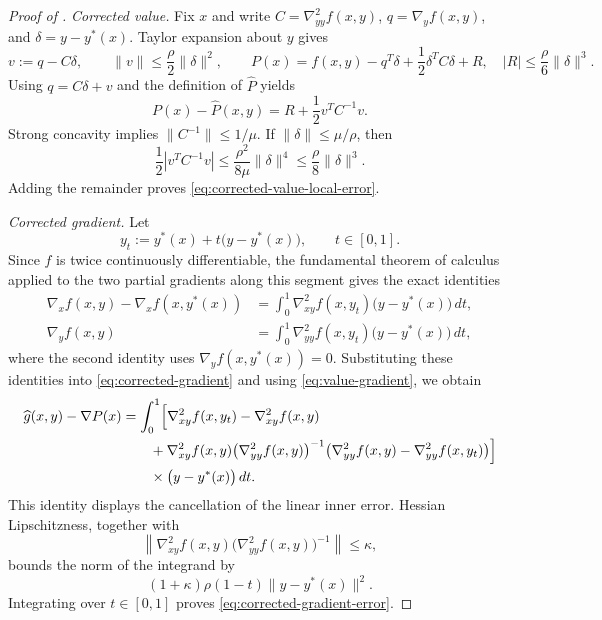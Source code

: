 \documentclass{article}
\begin{document}
\begin{proof}[Proof of ]
\smallskip\noindent\emph{Corrected value.}
Fix $x$ and write $C=\nabla^2_{yy}f(x,y)$,
$q=\nabla_yf(x,y)$, and $\delta=y-y^*(x)$.
Taylor expansion about $y$ gives
\[
 v:=q-C\delta,\qquad
 \|v\|\le\frac\rho2\|\delta\|^2,\qquad
 P(x)=f(x,y)-q^T\delta+\frac12\delta^TC\delta+R,
 \quad |R|\le\frac\rho6\|\delta\|^3.
\]
Using $q=C\delta+v$ and the definition of $\widehat P$ yields
\[
 P(x)-\widehat P(x,y)=R+\frac12v^TC^{-1}v.
\]
Strong concavity implies $\|C^{-1}\|\le1/\mu$.  If
$\|\delta\|\le\mu/\rho$, then
\[
 \frac12|v^TC^{-1}v|
 \le\frac{\rho^2}{8\mu}\|\delta\|^4
 \le\frac\rho8\|\delta\|^3.
\]
Adding the remainder proves \eqref{eq:corrected-value-local-error}.

\smallskip\noindent\emph{Corrected gradient.}
Let
\[
 y_t:=y^*(x)+t\bigl(y-y^*(x)\bigr),
 \qquad t\in[0,1].
\]
Since $f$ is twice continuously differentiable, the fundamental theorem
of calculus applied to the two partial gradients along this segment
gives the exact identities
\begin{align*}
 \nabla_xf(x,y)-\nabla_xf(x,y^*(x))
 &=\int_0^1\nabla^2_{xy}f(x,y_t)
       \bigl(y-y^*(x)\bigr)\,dt,\\
 \nabla_yf(x,y)
 &=\int_0^1\nabla^2_{yy}f(x,y_t)
       \bigl(y-y^*(x)\bigr)\,dt,
\end{align*}
where the second identity uses $\nabla_yf(x,y^*(x))=0$.
Substituting these identities into \eqref{eq:corrected-gradient} and
using \eqref{eq:value-gradient}, we obtain
\begin{align*}
 \widehat g(x,y)-\nabla P(x)
 &=\int_0^1\Bigl[
   \nabla^2_{xy}f(x,y_t)-\nabla^2_{xy}f(x,y)\\
 &\qquad
   +\nabla^2_{xy}f(x,y)
    \bigl(\nabla^2_{yy}f(x,y)\bigr)^{-1}
    \bigl(
      \nabla^2_{yy}f(x,y)-\nabla^2_{yy}f(x,y_t)
    \bigr)
  \Bigr]\\
 &\qquad {}\times\bigl(y-y^*(x)\bigr)\,dt.
\end{align*}
This identity displays the cancellation of the linear inner error.
Hessian Lipschitzness, together with
\[
 \left\|\nabla^2_{xy}f(x,y)
   \bigl(\nabla^2_{yy}f(x,y)\bigr)^{-1}\right\|\le\kappa,
\]
bounds the norm of the integrand by
\[
 (1+\kappa)\rho(1-t)\|y-y^*(x)\|^2.
\]
Integrating over $t\in[0,1]$ proves
\eqref{eq:corrected-gradient-error}.


\end{proof}
\end{document}
